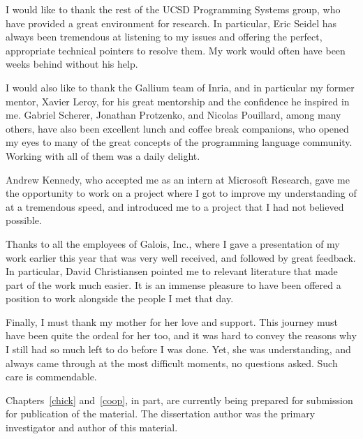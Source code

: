 \documentclass[12pt]{ucsddissertation}
\begin{document}
\begin{acknowledgements}
I would like to thank the rest of the UCSD Programming Systems group, who have
provided a great environment for research.  In particular, Eric Seidel has
always been tremendous at listening to my issues and offering the perfect,
appropriate technical pointers to resolve them.  My work would often have been
weeks behind without his help.

I would also like to thank the Gallium team of Inria, and in particular my
former mentor, Xavier Leroy, for his great mentorship and the confidence he
inspired in me.  Gabriel Scherer, Jonathan Protzenko, and Nicolas Pouillard,
among many others, have also been excellent lunch and coffee break companions,
who opened my eyes to many of the great concepts of the programming language
community.  Working with all of them was a daily delight.

Andrew Kennedy, who accepted me as an intern at Microsoft Research, gave me the
opportunity to work on a project where I got to improve my understanding of
\Coq{} at a tremendous speed, and introduced me to a project that I had not
believed possible.

Thanks to all the employees of Galois, Inc., where I gave a presentation of my
work earlier this year that was very well received, and followed by great
feedback.  In particular, David Christiansen pointed me to relevant literature
that made part of the work much easier.  It is an immense pleasure to have been
offered a position to work alongside the people I met that day.

Finally, I must thank my mother for her love and support.  This journey must
have been quite the ordeal for her too, and it was hard to convey the reasons
why I still had so much left to do before I was done.  Yet, she was
understanding, and always came through at the most difficult moments, no
questions asked.  Such care is commendable.

Chapters~\ref{chick} and~\ref{coop}, in part, are currently being prepared for
submission for publication of the material.  The dissertation author was the
primary investigator and author of this material.




\end{acknowledgements}
\end{document}
